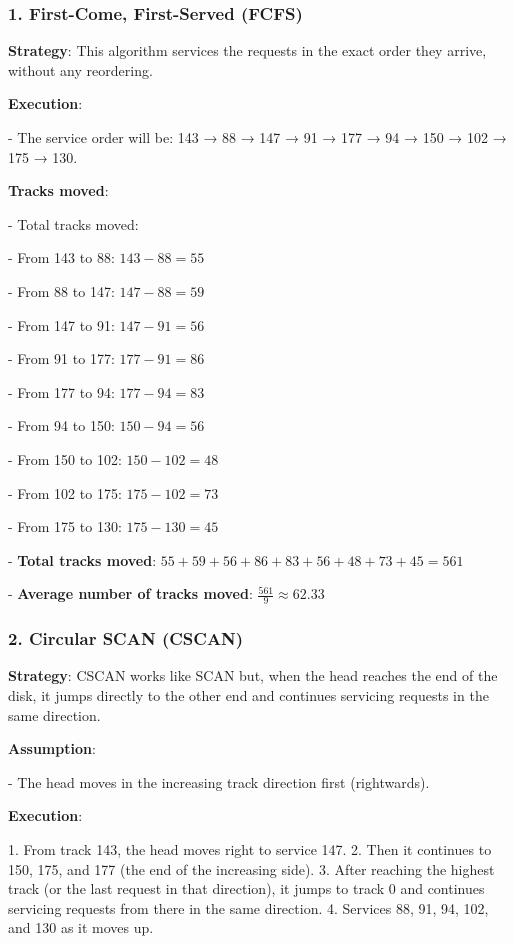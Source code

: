 \documentclass[a4paper]{book}
\begin{document}
\subsubsection{1. \textbf{First-Come, First-Served (FCFS)}}

\textbf{Strategy}:
This algorithm services the requests in the exact order they arrive, without any reordering.

\textbf{Execution}:

- The service order will be: 143 → 88 → 147 → 91 → 177 → 94 → 150 → 102 → 175 → 130.


\textbf{Tracks moved}:

- Total tracks moved:

  
  - From 143 to 88: \(143 - 88 = 55\)

  - From 88 to 147: \(147 - 88 = 59\)

  - From 147 to 91: \(147 - 91 = 56\)

  - From 91 to 177: \(177 - 91 = 86\)

  - From 177 to 94: \(177 - 94 = 83\)

  - From 94 to 150: \(150 - 94 = 56\)

  - From 150 to 102: \(150 - 102 = 48\)

  - From 102 to 175: \(175 - 102 = 73\)

  - From 175 to 130: \(175 - 130 = 45\)


- \textbf{Total tracks moved}: \(55 + 59 + 56 + 86 + 83 + 56 + 48 + 73 + 45 = 561\)


- \textbf{Average number of tracks moved}: \(\frac{561}{9} \approx 62.33\)


\subsubsection{2. \textbf{Circular SCAN (CSCAN)}}

\textbf{Strategy}:
CSCAN works like SCAN but, when the head reaches the end of the disk, it jumps directly to the other end and continues servicing requests in the same direction.

\textbf{Assumption}:

- The head moves in the increasing track direction first (rightwards).


\textbf{Execution}:

1. From track 143, the head moves right to service 147.
2. Then it continues to 150, 175, and 177 (the end of the increasing side).
3. After reaching the highest track (or the last request in that direction), it jumps to track 0 and continues servicing requests from there in the same direction.
4. Services 88, 91, 94, 102, and 130 as it moves up.
\end{document}

